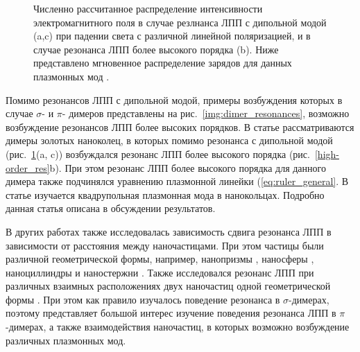 \begin{figure}
\caption{Численно рассчитанное распределение интенсивности электромагнитного поля в случае резлнанса ЛПП с дипольной модой (a,c) при падении света с различной линейной поляризацией, и в случае резонанса ЛПП более высокого порядка (b). Ниже представлено мгновенное распределение зарядов для данных плазмонных мод \cite{nanoring}.}
\label{img:high-order_res}
\end{figure}
Помимо резонансов ЛПП с дипольной модой, примеры возбуждения которых в случае $ \sigma $-  и $ \pi $- димеров представлены на рис.~\ref{img:dimer_resonances}, возможно возбуждение резонансов ЛПП более высоких порядков. В статье \cite{nanoring} рассматриваются димеры золотых наноколец, в которых помимо резонанса с дипольной модой (рис.~\ref{img:high-order_res}(a, c)) возбуждался резонанс ЛПП более высокого порядка (рис.~\ref{high-order_res}b). При этом резонанс ЛПП более высокого порядка для данного димера также подчинялся уравнению плазмонной линейки (\ref{eq:ruler_general}. В статье \cite{diffractionCoupling} изучается квадрупольная плазмонная мода в нанокольцах. Подробно данная статья описана в обсуждении результатов.

В других работах также исследовалась зависимость сдвига резонанса ЛПП в зависимости от расстояния между наночастицами. При этом частицы были различной геометрической формы, например, нанопризмы \cite{nanoprism, nanoshells}, наносферы \cite{nanospheres, nanospheres2}, наноциллиндры \cite{nanocyllinders} и наностержни \cite{nanorods}. Также исследовался резонанс ЛПП при различных взаимных расположениях двух наночастиц одной геометрической формы \cite{nanorods2, nanorods3, 3druler}. При этом как правило изучалось поведение резонанса в $ \sigma$-димерах, поэтому представляет большой интерес изучение поведения резонанса ЛПП в $ \pi$-димерах, а также взаимодействия наночастиц, в которых возможно возбуждение различных плазмонных мод. 